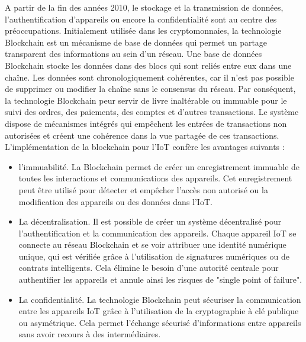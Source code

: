 A partir de la fin des années 2010, le stockage et la transmission de données, l'authentification d'appareils ou encore la confidentialité sont au centre des préoc\-cupations. Initialement utilisée dans les cryptomonnaies, la technologie Blockchain est un mécanisme de base de données qui permet un partage transparent des informations au sein d'un réseau. Une base de données Blockchain stocke les données dans des blocs qui sont reliés entre eux dans une chaîne. Les données sont chronologiquement cohérentes, car il n'est pas possible de supprimer ou modifier la chaîne sans le consensus du réseau. Par conséquent, la technologie Blockchain peur servir de livre inaltérable ou immuable pour le suivi des ordres, des paiements, des comptes et d'autres transactions. Le système dispose de mécanismes intégrés qui empêchent les entrées de transactions non autorisées et créent une cohérence dans la vue partagée de ces transactions. L'implémentation de la blockchain pour l'\ac{IoT} confère les avantages suivants\cite{block} : 
\begin{itemize}
\item l'immuabilité. La Blockchain permet de créer un enregistrement immuable de toutes les interactions et communications des appareils. Cet enregistrement peut être utilisé pour détecter et empêcher l'accès non autorisé ou la modification des appareils ou des données dans l'\ac{IoT}.
\item La décentralisation. Il est possible de créer un système décentralisé pour l’authentification et la communication des appareils. Chaque appareil \ac{IoT} se connecte au réseau Blockchain et se voir attribuer une identité numérique unique, qui est vérifiée grâce à l'utilisation de signatures numériques ou de contrats intelligents. Cela élimine le besoin d’une autorité centrale pour authentifier les appareils et annule ainsi les risques de "single point of failure".
\item La confidentialité. La technologie Blockchain peut sécuriser la communication entre les appareils IoT grâce à l'utilisation de la cryptographie à clé publique ou asymétrique. Cela permet l’échange sécurisé d’informations entre appareils sans avoir recours à des intermédiaires.
\end{itemize}

\vspace{0.1cm}

